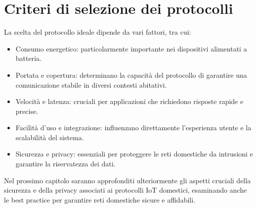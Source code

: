 \section{Criteri di selezione dei protocolli}
La scelta del protocollo ideale dipende da vari fattori, tra cui:
\begin{itemize}
    \item Consumo energetico: particolarmente importante nei dispositivi alimentati a batteria.
    \item Portata e copertura: determinano la capacità del protocollo di garantire una comunicazione stabile in diversi contesti abitativi.
    \item Velocità e latenza: cruciali per applicazioni che richiedono risposte rapide e precise.
    \item Facilità d'uso e integrazione: influenzano direttamente l'esperienza utente e la scalabilità del sistema.
    \item Sicurezza e privacy: essenziali per proteggere le reti domestiche da intrusioni e garantire la riservatezza dei dati.
\end{itemize}

Nel prossimo capitolo saranno approfonditi ulteriormente gli aspetti cruciali della sicurezza e della privacy associati ai protocolli IoT domestici, esaminando anche le best practice per garantire reti domestiche sicure e affidabili.